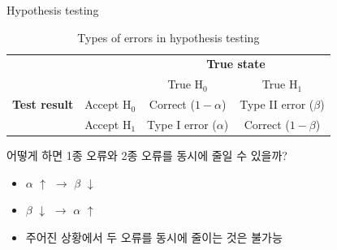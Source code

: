 \documentclass[9pt,ignorenonframetext,xcolor=dvipsnames]{beamer}
\providecommand{\tightlist}{%
  \setlength{\itemsep}{0pt}\setlength{\parskip}{0pt}}
\newlength{\wideitemsep}
\let\olditem\item
\renewcommand{\item}{\setlength{\itemsep}{\wideitemsep}\olditem}
\begin{document}
\begin{frame}{Hypothesis testing}

\begin{table}
  \centering
  \caption{Types of errors in hypothesis testing}
  \begingroup\footnotesize
  \begin{tabular}{cccc}
  \toprule
                              &                         & \multicolumn{2}{c}{\textbf{True state}} \\ \cmidrule(l){3-4}
                              &                         & True $\mathrm{H}_{0}$    & True $\mathrm{H}_{1}$ \\
  \midrule  
  \textbf{Test result}       & Accept $\mathrm{H}_{0}$  & Correct ($1-\alpha$)     & Type II error ($\beta$)\\
                             & Accept $\mathrm{H}_{1}$  & Type I error ($\alpha$)  &  Correct ($1-\beta$) \\
  \bottomrule                  
  \end{tabular}
  \endgroup
\end{table}

어떻게 하면 1종 오류와 2종 오류를 동시에 줄일 수 있을까?

\begin{itemize}
\tightlist
\item
  \(\alpha\) \(\uparrow\) \(\rightarrow\) \(\beta\) \(\downarrow\)
\item
  \(\beta\) \(\downarrow\) \(\rightarrow\) \(\alpha\) \(\uparrow\)
\item
  주어진 상황에서 두 오류를 동시에 줄이는 것은 불가능
\end{itemize}

\end{frame}
\end{document}
